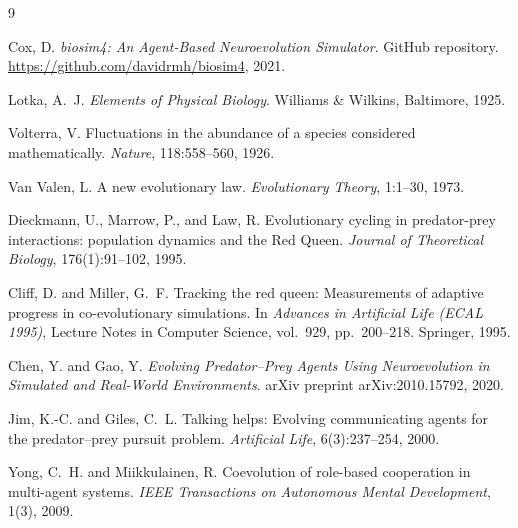 \documentclass[11pt]{article}
\begin{document}
\newpage
\begin{thebibliography}{9}

Cox, D.
\textit{biosim4: An Agent-Based Neuroevolution Simulator}.
GitHub repository. \url{https://github.com/davidrmh/biosim4}, 2021.

Lotka, A.~J.
\textit{Elements of Physical Biology}.
Williams \& Wilkins, Baltimore, 1925.

Volterra, V.
Fluctuations in the abundance of a species considered mathematically.
\textit{Nature}, 118:558--560, 1926.

Van Valen, L.
A new evolutionary law.
\textit{Evolutionary Theory}, 1:1--30, 1973.

Dieckmann, U., Marrow, P., and Law, R.
Evolutionary cycling in predator-prey interactions: population dynamics and the Red Queen.
\textit{Journal of Theoretical Biology}, 176(1):91--102, 1995.

Cliff, D. and Miller, G.~F.
Tracking the red queen: Measurements of adaptive progress in co-evolutionary simulations.
In \textit{Advances in Artificial Life (ECAL 1995)}, Lecture Notes in Computer Science,
vol.\ 929, pp.\ 200--218. Springer, 1995.

Chen, Y. and Gao, Y.
\textit{Evolving Predator--Prey Agents Using Neuroevolution in Simulated and Real-World
Environments}.
arXiv preprint arXiv:2010.15792, 2020.

Jim, K.-C. and Giles, C.~L.
Talking helps: Evolving communicating agents for the predator--prey pursuit problem.
\textit{Artificial Life}, 6(3):237--254, 2000.

Yong, C.~H. and Miikkulainen, R.
Coevolution of role-based cooperation in multi-agent systems.
\textit{IEEE Transactions on Autonomous Mental Development}, 1(3), 2009.

\end{thebibliography}
\end{document}
